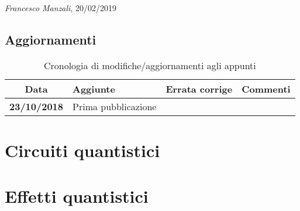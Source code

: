 \documentclass[12pt]{report} %
\theoremstyle{plain}
\theoremstyle{definition}
\theoremstyle{remark}
\begin{document}
\begin{flushright}
\textit{Francesco Manzali}, 20/02/2019
\end{flushright}
\clearpage
\section*{Aggiornamenti}
\begin{table}[hb]
    \centering
    \begin{tabular}{|cm{3cm}m{5cm}m{3cm}|}\toprule
        Data & Aggiunte & Errata corrige & Commenti\\\midrule
        \textbf{23/10/2018} & Prima pubblicazione & & \\
        \bottomrule
    \end{tabular}
    \caption{Cronologia di modifiche/aggiornamenti agli appunti}
    \label{updates}
\end{table}

\clearpage

\chapter{Circuiti quantistici}




\chapter{Effetti quantistici}









\listoffigures

\listoftables
\end{document}
